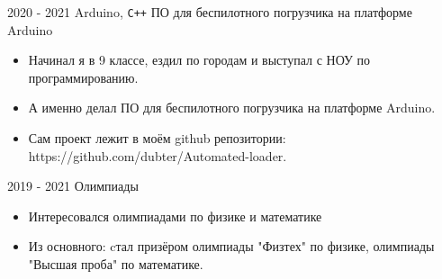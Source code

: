 \experience
{2020 - 2021}
{Arduino, \texttt{C++}}
{ПО для беспилотного погрузчика на платформе Arduino}
{\begin{itemize}
    \item Начинал я в 9 классе, ездил по городам и выступал с НОУ по программированию. 
    \item А именно делал ПО для беспилотного погрузчика на платформе Arduino.
    \item Сам проект лежит в моём github репозитории: https://github.com/dubter/Automated-loader. 
\end{itemize}}

\experience
{2019 - 2021}
{}
{Олимпиады}
{\begin{itemize}
    \item Интересовался олимпиадами по физике и математике
    \item Из основного: cтал призёром олимпиады "Физтех" по физике, олимпиады "Высшая проба" по математике.
\end{itemize}}